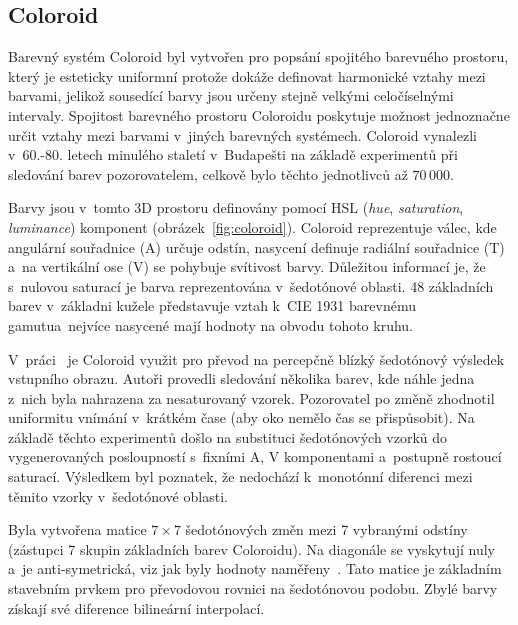\documentclass[11pt,a4paper,oneside]{article}
\begin{document}
	\subsection{Coloroid}
	Barevný systém Coloroid byl vytvořen pro popsání spojitého barevného prostoru,
	který je esteticky uniformní protože dokáže definovat harmonické vztahy mezi barvami,
	jelikož sousedící barvy jsou určeny stejně velkými celočíselnými intervaly.
	Spojitost barevného prostoru Coloroidu poskytuje možnost jednoznačne určit
	vztahy mezi barvami v~jiných barevných systémech. Coloroid vynalezli v~60.-80. letech
	minulého staletí v~Budapešti na základě experimentů při sledování barev pozorovatelem,
	celkově bylo těchto jednotlivců až $70\,000$.

	Barvy jsou v~tomto 3D prostoru definovány pomocí HSL (\emph{hue}, \emph{saturation},
	\emph{luminance}) komponent (obrázek~\ref{fig:coloroid}).
	Coloroid reprezentuje válec, kde angulární souřadnice
	(A) určuje odstín, nasycení definuje radiální souřadnice (T) a~na vertikální ose (V)
	se pohybuje svítivost barvy. Důležitou informací je, že s~nulovou saturací je barva
	reprezentována v~šedotónové oblasti. 48 základních barev  v~základni kužele
	představuje vztah k~CIE 1931 barevnému gamutua~nejvíce nasycené mají hodnoty na obvodu tohoto kruhu.

	V~práci~\cite{cadik07color_to_gray} je Coloroid využit pro převod na percepčně blízký šedotónový výsledek
	vstupního obrazu. Autoři provedli sledování několika barev, kde náhle jedna z~nich byla
	nahrazena za nesaturovaný vzorek. Pozorovatel po změně zhodnotil uniformitu vnímání v~krátkém
	čase (aby oko nemělo čas se přispůsobit). Na základě těchto experimentů došlo na
	substituci šedotónových vzorků do vygenerovaných posloupností s~fixními A, V komponentami
	a~postupně rostoucí saturací. Výsledkem byl poznatek, že nedochází k~monotónní diferenci mezi
	těmito vzorky v~šedotónové oblasti.

	Byla vytvořena matice $7 \times 7$ šedotónových změn mezi 7 vybranými odstíny (zástupci 7 skupin
	základních barev Coloroidu). Na diagonále se vyskytují nuly a~je anti-symetrická, viz
	jak byly hodnoty naměřeny~\cite{cadik07color_to_gray}. Tato matice je základním stavebním prvkem pro převodovou
	rovnici na šedotónovou podobu. Zbylé barvy získají své diference bilineární interpolací.
\end{document}
